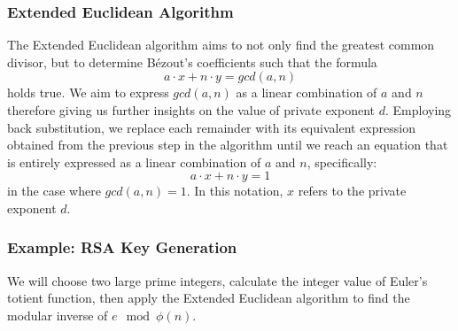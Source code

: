 \documentclass{article}
\begin{document}
\subsubsection{Extended Euclidean Algorithm}
The Extended Euclidean algorithm aims to not only find the greatest common divisor, but to determine Bézout's coefficients such that the formula 
\begin{equation}
a \cdot x + n \cdot y = gcd(a, n)
\end{equation}
holds true. We aim to express $gcd(a, n)$ as a linear combination of $a$ and $n$ therefore giving us further insights on the value of private exponent $d$. Employing back substitution, we replace each remainder with its equivalent expression obtained from the previous step in the algorithm until we reach an equation that is entirely expressed as a linear combination of $a$ and $n$, specifically:
\begin{equation}
a \cdot x + n \cdot y = 1
\end{equation}
in the case where $gcd(a,n) = 1$. In this notation, $x$ refers to the private exponent $d$.

\subsubsection{Example: RSA Key Generation}
We will choose two large prime integers, calculate the integer value of Euler's totient function, then apply the Extended Euclidean algorithm to find the modular inverse of $e \mod \phi(n)$. 
\end{document}
